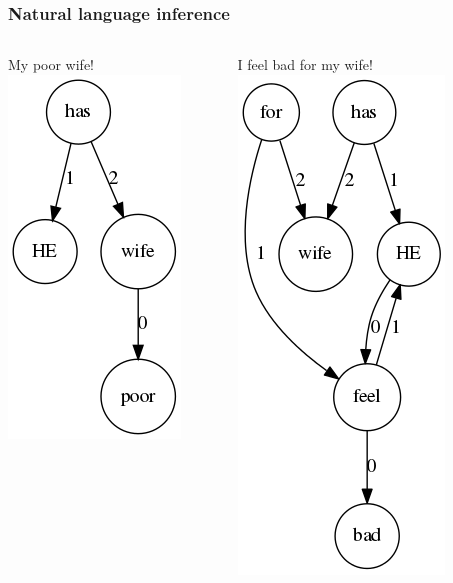 \documentclass[bigger]{beamer}
\begin{document}
\begin{frame}
\frametitle{Natural language inference}
\begin{columns}
	\begin{column}{0.3\textwidth}
		\pause My poor wife!
		\pause \includegraphics[scale=0.4]{pics/wifepoor.png}
	\end{column}
	\begin{column}{0.4\textwidth}
		I feel bad for my wife!
		\pause \includegraphics[scale=0.4]{pics/feelbad.png}
	\end{column}
\end{columns}
\end{frame}
\end{document}
